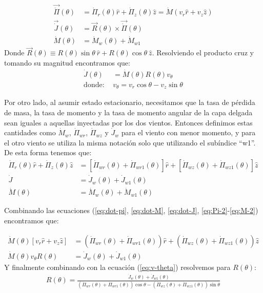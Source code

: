\begin{align}
  \vec{\dot{\Pi}}(\theta) &= \dot{\Pi}_r(\theta) \hat{r} + \dot{\Pi}_z(\theta) \hat{z} = \dot{M}\left(v_r \hat{r} + v_z\hat{z}\right) \label{eq:dot-pi}\\
  \vec{\dot{J}}(\theta) &= \vec{R}(\theta) \times \vec{\dot{\Pi}}(\theta)  \\
  \dot{M}(\theta) &= \dot{M}_w(\theta) + \dot{M}_{w1} \label{eq:dot-M}
\end{align}
Donde $\vec{R}(\theta)\equiv R(\theta)\sin\theta~\hat{r} + R(\theta)\cos\theta~\hat{z}$. Resolviendo el producto cruz y tomando su magnitud encontramos que:
\begin{align}
  \dot{J}(\theta) &= \dot{M}(\theta)R(\theta)v_\theta \label{eq:dot-J}\\
  \mathrm{donde:~} & v_\theta = v_r\cos\theta - v_z\sin\theta \label{eq:v-theta}
\end{align}

Por otro lado, al asumir estado estacionario, necesitamos que la tasa de pérdida de masa, la tasa de momento y la tasa de momento angular de la capa delgada sean iguales a aquellas inyectadas por los dos vientos. Entonces definimos estas cantidades como $\dot{M}_w$, $\dot{\Pi}_{wr}$, $\dot{\Pi}_{wz}$ y $\dot{J}_{w}$ para el viento con menor momento, y para el otro viento se utiliza la misma notación solo que utilizando el subíndice ``w1''. De esta forma tenemos que:
\begin{align}
  \dot{\Pi}_r(\theta)\hat{r} + \dot{\Pi}_z(\theta)\hat{z} &= \left[\dot{\Pi}_{wr}(\theta)+ \dot{\Pi}_{wr1}(\theta)\right]\hat{r} + \left[\dot{\Pi}_{wz}(\theta)+ \dot{\Pi}_{wz1}(\theta)\right]\hat{z} \label{eq:Pi-2} \\
  \dot{J} &=\dot{J}_w(\theta) + \dot{J}_{w1}(\theta) \label{eq:J-2}\\
  \dot{M}(\theta) &= \dot{M}_w(\theta) + \dot{M}_{w1}(\theta) \label{eq:M-2}
\end{align}

Combinando las ecuaciones (\ref{eq:dot-pi}, \ref{eq:dot-M}, \ref{eq:dot-J}, \ref{eq:Pi-2}-\ref{eq:M-2}) encontramos que:

\begin{align}
  \dot{M}(\theta)\left[v_r \hat{r} + v_z\hat{z}\right] &= \left(\dot{\Pi}_{wr}(\theta) + \dot{\Pi}_{wr1}(\theta)\right)\hat{r} +
                                                         \left(\dot{\Pi}_{wz}(\theta) + \dot{\Pi}_{wz1}(\theta)\right)\hat{z} \\
  \dot{M}(\theta)v_\theta R(\theta) &= \dot{J}_w(\theta) + \dot{J}_{w1}(\theta)
\end{align}
Y finalmente combinando con la ecuación (\ref{eq:v-theta}) resolvemos para $R(\theta)$:
\begin{align}
  R(\theta) = \frac{\dot{J}_w(\theta) + \dot{J}_{w1}(\theta)}{\left(\dot{\Pi}_{wr}(\theta) + \dot{\Pi}_{wr1}(\theta)\right)\cos\theta - \left(\dot{\Pi}_{wz}(\theta) + \dot{\Pi}_{wz1}(\theta)\right)\sin\theta} \label{eq:R-wind}
\end{align}

